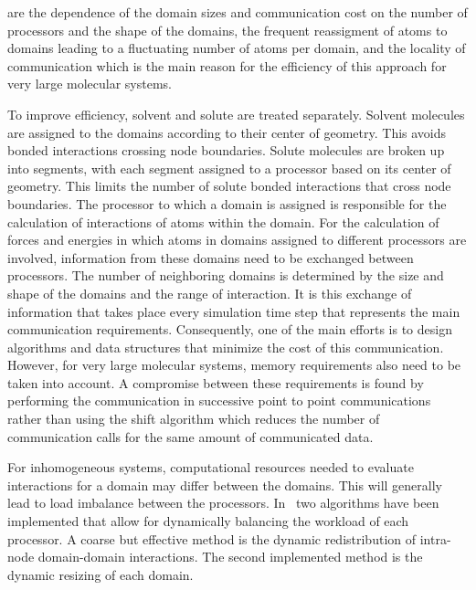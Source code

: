 are the dependence of the domain sizes and communication cost on
the number of processors and the shape of the domains, the
frequent reassigment of atoms to domains leading to a fluctuating
number of atoms per domain, and the locality of communication
which is the main reason for the efficiency of this approach for
very large molecular systems.
\par
To improve efficiency, solvent and solute are treated separately.
Solvent molecules are assigned to the domains according to their
center of geometry. This avoids bonded interactions crossing node
boundaries. Solute molecules are broken up into segments, with each 
segment assigned to a processor based on its center of geometry. 
This limits the number
of solute bonded interactions that cross node boundaries.
The processor to which a domain is assigned is responsible for
the calculation of interactions of atoms within the domain.
For the  calculation of forces and energies in which atoms in
domains assigned to different processors are involved, information
from these domains need to be exchanged between processors. The
number of neighboring domains is determined by the size and shape
of the domains and the range of interaction. It is this exchange
of information that takes place every simulation time step
that represents the main communication requirements.
Consequently, one of the main efforts is to design algorithms and
data structures that minimize the cost of this
communication. However, for very large molecular systems, memory
requirements also need to be taken into account. A compromise between
these requirements is found by performing the communication in
successive point to point communications rather than using the
shift algorithm which reduces the number of communication calls
for the same amount of communicated data.
\par
For inhomogeneous systems, computational resources needed to evaluate 
interactions for a domain may differ between the domains. 
This will generally lead to load imbalance between the processors.
In \nwargos\ two algorithms have been implemented that allow for 
dynamically balancing the workload of each processor. 
A coarse but effective method is the dynamic redistribution of 
intra-node domain-domain interactions. The
second implemented method is the dynamic resizing of each domain.
